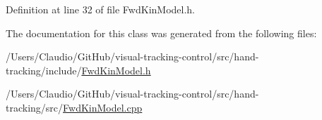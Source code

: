 Definition at line 32 of file Fwd\+Kin\+Model.\+h.



The documentation for this class was generated from the following files\+:\begin{DoxyCompactItemize}
\item 
/\+Users/\+Claudio/\+Git\+Hub/visual-\/tracking-\/control/src/hand-\/tracking/include/\hyperlink{FwdKinModel_8h}{Fwd\+Kin\+Model.\+h}\item 
/\+Users/\+Claudio/\+Git\+Hub/visual-\/tracking-\/control/src/hand-\/tracking/src/\hyperlink{FwdKinModel_8cpp}{Fwd\+Kin\+Model.\+cpp}\end{DoxyCompactItemize}
